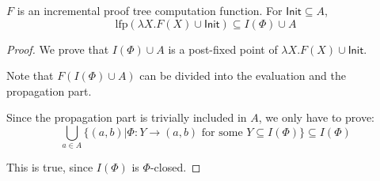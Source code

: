 \documentclass[12pt]{article}
\begin{document}
\begin{theorem}[Completeness]
	$F$ is an incremental proof tree computation function.
  For $\mathsf{Init}\subseteq A$,
  \[\text{lfp}(\lambda X.F(X)\cup\mathsf{Init})\subseteq I(\Phi)\cup A\]
\end{theorem}
\begin{proof}
  We prove that $I(\Phi)\cup A$ is a post-fixed point of $\lambda X.F(X)\cup\mathsf{Init}$.

	Note that $F(I(\Phi)\cup A)$ can be divided into the evaluation and the propagation part.

	Since the propagation part is trivially included in $A$, we only have to prove:
	\[\bigcup_{a\in A}\{(a,b)|\Phi:Y\rightarrow(a,b)\text{ for some }Y\subseteq I(\Phi)\}\subseteq I(\Phi)\]

	This is true, since $I(\Phi)$ is $\Phi$-closed.
\end{proof}
\end{document}
